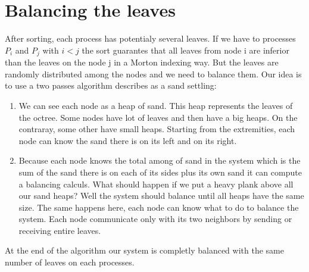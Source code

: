 \documentclass[10pt,letterpaper,titlepage]{report}
\begin{document}

\section{Balancing the leaves}
After sorting, each process has potentialy several leaves.
If we have to processes $P_{i}$ and $P_{j}$ with $i < j$ the sort guarantes that all leaves from node i are inferior than the leaves on the node j in a Morton indexing way.
But the leaves are randomly distributed among the nodes and we need to balance them.
Our idea is to use a two passes algorithm describes as a sand settling:
\begin{enumerate}
\item We can see each node as a heap of sand.
This heap represents the leaves of the octree.
Some nodes have lot of leaves and then have a big heaps.
On the contraray, some other have small heaps.
Starting from the extremities, each node can know the sand there is on its left and on its right.
\item Because each node knows the total among of sand in the system which is the sum of the sand there is on each of its sides plus its own sand it can compute a balancing calculs.
What should happen if we put a heavy plank above all our sand heaps?
Well the system should balance until all heaps have the same size.
The same happens here, each node can know what to do to balance the system.
Each node communicate only with its two neighbors by sending or receiving entire leaves.
\end{enumerate}

At the end of the algorithm our system is completly balanced with the same number of leaves on each processes.
\end{document}
